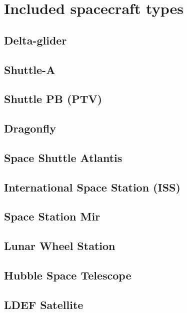 \documentclass[Orbiter User Manual.tex]{subfiles}
\begin{document}
\section{Included spacecraft types}

\subsection{Delta-glider}

\subsection{Shuttle-A}

\subsection{Shuttle PB (PTV)}

\subsection{Dragonfly}

\subsection{Space Shuttle Atlantis}

\subsection{International Space Station (ISS)}

\subsection{Space Station Mir}

\subsection{Lunar Wheel Station}

\subsection{Hubble Space Telescope}

\subsection{LDEF Satellite}
\end{document}
